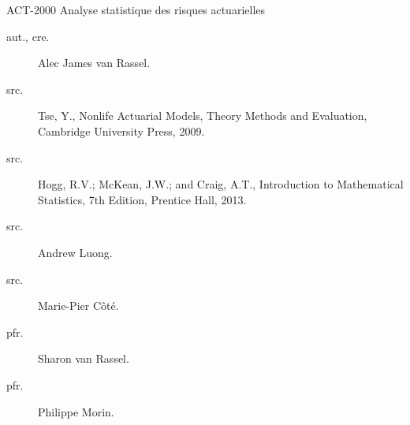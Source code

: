 \begin{contrib}{ACT-2000\: Analyse statistique des risques actuarielles}
\begin{description}
	\item[aut., cre.] Alec James van Rassel.
	\item[src.]	Tse, Y., Nonlife Actuarial Models, Theory Methods and Evaluation, Cambridge University Press, 2009.
	\item[src.]	Hogg, R.V.; McKean, J.W.; and Craig, A.T., Introduction to Mathematical Statistics, 7th Edition, Prentice Hall, 2013.
	\item[src.]	Andrew Luong.
	\item[src.]	Marie-Pier Côté.
	\item[pfr.]	Sharon van Rassel.
	\item[pfr.]	Philippe Morin.
\end{description}
\end{contrib}
